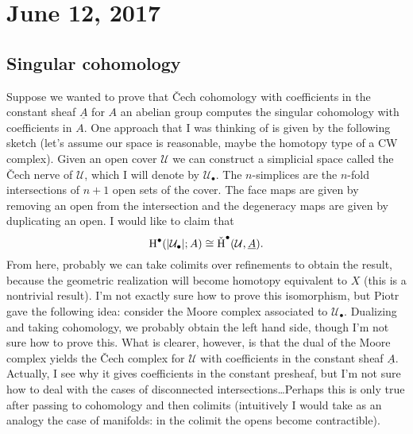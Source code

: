\documentclass{amsart}
\begin{document}
\section{June 12, 2017}

\subsection{Singular cohomology}
Suppose we wanted to prove that \v Cech cohomology with coefficients in the constant
sheaf $\underline A$ for $A$ an abelian group computes the singular cohomology with
coefficients in $A$. One approach that I was thinking of is given by 
the following sketch (let's assume our space is reasonable, maybe the homotopy type
of a CW complex). Given an open cover
$\mathcal{U}$ we can construct a simplicial space called the \v Cech nerve of $\mathcal{U}$,
which I will denote by $\mathcal{U}_\bullet$.
The $n$-simplices are the $n$-fold intersections of $n+1$ open sets of the cover. The
face maps are given by removing an open from the intersection and the degeneracy maps
are given by duplicating an open. I would like to claim that
\begin{equation*}
    \operatorname{H}^\bullet(|\mathcal{U}_\bullet|;A) \cong \check{\operatorname{H}}^\bullet(\mathcal{U}, \underline{A}).
\end{equation*}
From here, probably we can take colimits over refinements to obtain the result, because
the geometric realization will become homotopy equivalent to $X$ (this is a nontrivial
result).
I'm not exactly sure how to prove this isomorphism, but Piotr gave the following idea:
consider the Moore complex associated to $\mathcal{U}_\bullet$. Dualizing and taking
cohomology, we probably obtain the left hand side, though I'm not sure how to prove this.
What is clearer, however, is that the dual of the Moore complex yields the \v Cech
complex for $\mathcal{U}$ with coefficients in the constant sheaf $\underline A$.
Actually, I see why it gives coefficients in the constant presheaf, but I'm not sure
how to deal with the cases of disconnected intersections\ldots Perhaps this is only
true after passing to cohomology and then colimits (intuitively I would take as an
analogy the case of manifolds: in the colimit the opens become contractible).
\end{document}
